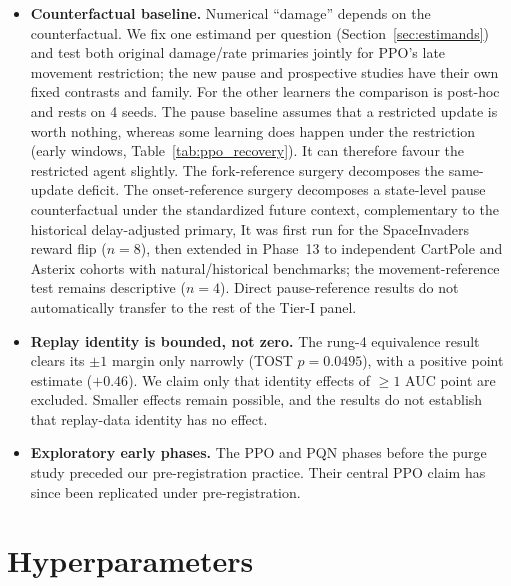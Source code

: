 \documentclass[10pt]{article} %
\begin{document}
\begin{itemize}
\item \textbf{Counterfactual baseline.} Numerical ``damage'' depends on the counterfactual. We fix one estimand per question (Section~\ref{sec:estimands}) and test both original damage/rate primaries jointly for PPO's late movement restriction; the new pause and prospective studies have their own fixed contrasts and family. For the other learners the comparison is post-hoc and rests on 4 seeds. The pause baseline assumes that a restricted update is worth nothing, whereas some learning does happen under the restriction (early windows, Table~\ref{tab:ppo_recovery}). It can therefore favour the restricted agent slightly. The fork-reference surgery decomposes the same-update deficit. The onset-reference surgery decomposes a state-level pause counterfactual under the standardized future context, complementary to the historical delay-adjusted primary, It was first run for the SpaceInvaders reward flip ($n=8$), then extended in Phase~13 to independent CartPole and Asterix cohorts with natural/historical benchmarks; the movement-reference test remains descriptive ($n=4$). Direct pause-reference results do not automatically transfer to the rest of the Tier-I panel.
\item \textbf{Replay identity is bounded, not zero.} The rung-4 equivalence result clears its $\pm1$ margin only narrowly (TOST $p=0.0495$), with a positive point estimate ($+0.46$). We claim only that identity effects of $\geq1$ AUC point are excluded. Smaller effects remain possible, and the results do not establish that replay-data identity has no effect.
\item \textbf{Exploratory early phases.} The PPO and PQN phases before the purge study preceded our pre-registration practice. Their central PPO claim has since been replicated under pre-registration.
\end{itemize}


\clearpage
\section{Hyperparameters}\label{app:hparams}
\end{document}
